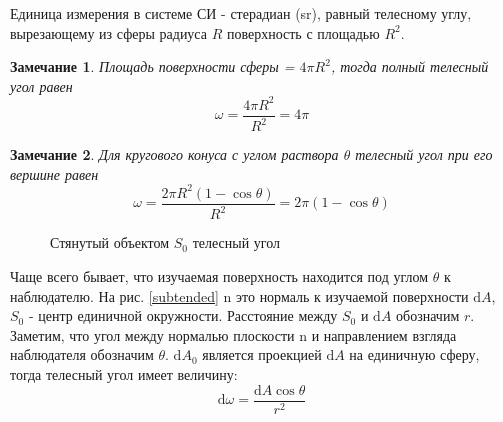 \documentclass[12pt]{article}
\def\d{ \mathrm{d} }
\newtheorem*{remark}{Замечание}
\begin{document}
Единица измерения в системе  СИ - стерадиан (sr), равный телесному углу,
вырезающему из сферы радиуса $R$ поверхность с площадью $R^2$.

\begin{remark}
  Площадь поверхности сферы = $4\pi R^2$, тогда полный телесный угол равен
  $$\omega=\frac{4\pi R^2}{R^2}=4\pi$$
\end{remark}

\begin{remark}
  Для кругового конуса с углом раствора $\theta$ телесный угол при его вершине
  равен $$\omega=\frac{2\pi R^2(1-\cos\theta)}{R^2}=2\pi(1-\cos\theta)$$
\end{remark}

\begin{figure}
  \begin{center}
    \caption{Стянутый объектом $S_0$ телесный угол}
    \label{subtended}
  \end{center}
\end{figure}

Чаще всего бывает, что изучаемая поверхность находится под углом $\theta$
к наблюдателю. На рис. \eqref{subtended} $\mathrm{n}$ это нормаль к
изучаемой поверхности $\d A$, $S_0$ - центр единичной окружности.
Расстояние между $S_0$ и $\d A$ обозначим $r$. Заметим, что угол между
нормалью плоскости $\mathrm{n}$ и направлением взгляда наблюдателя обозначим $\theta$.
$\d A_0$ является проекцией $\d A$ на единичную сферу, тогда телесный угол имеет величину:
$$\d \omega = \frac{\d A\cos\theta}{r^2}$$
\end{document}
